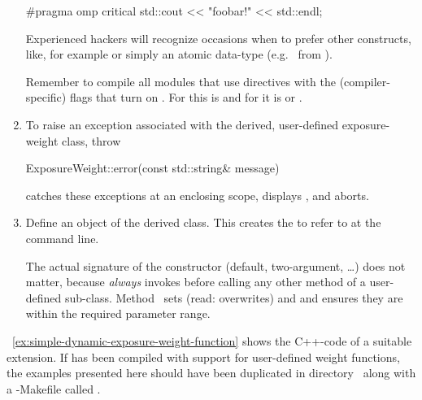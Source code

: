 \begin{enumerate}
  \begin{cxxlisting}
#pragma omp critical
{
    std::cout << "foobar!" << std::endl;
}
  \end{cxxlisting}

  Experienced hackers will recognize occasions when to prefer other constructs, like, for
  example  or simply an atomic data-type (e.g.~
  from ).

  Remember to compile all modules that use  directives with the
  (compiler-specific) flags that turn on .  For  this is
   and for  it is  or .

\item
  To raise an exception associated with the derived, user\hyp defined exposure\hyp weight class,
  throw
  \begin{literal}
    ExposureWeight::error(const std::string\& message)
  \end{literal}
  \App{} catches these exceptions at an enclosing scope, displays , and aborts.

\item
  Define an object of the derived class.  This creates the  to refer to at the
  \App{} command line.

  The actual signature of the constructor (default, two-argument, \dots) does not matter,
  because \App{} \emph{always} invokes  before calling any other method of a
  user-defined  sub-class.  Method~ sets (read:
  overwrites)  and  and ensures they are within the required
  parameter range.
\end{enumerate}

\exampleName~\ref{ex:simple-dynamic-exposure-weight-function} shows the C++-code of a suitable
extension.  If \App{} has been compiled with support for user-defined weight functions, the
examples presented here should have been duplicated in
directory~ along with a
-Makefile called .


